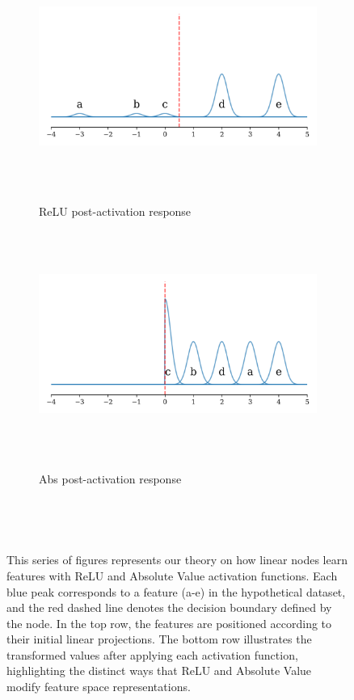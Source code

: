 \begin{figure}[ht]
    \begin{subfigure}[b]{0.49\textwidth}
        \centering
        \includegraphics[width=\textwidth]{images/activation_demo_relu_post}
        \caption{ReLU post-activation response}
        \label{fig:relu_post}
    \end{subfigure}
    \hfill
    \begin{subfigure}[b]{0.49\textwidth}
        \centering
        \includegraphics[width=\textwidth]{images/activation_demo_abs_post}
        \caption{Abs post-activation response}
        \label{fig:abs_post}
    \end{subfigure}

    \caption{This series of figures represents our theory on how linear nodes learn features with ReLU and Absolute Value activation functions. Each blue peak corresponds to a feature (a-e) in the hypothetical dataset, and the red dashed line denotes the decision boundary defined by the node. In the top row, the features are positioned according to their initial linear projections. The bottom row illustrates the transformed values after applying each activation function, highlighting the distinct ways that ReLU and Absolute Value modify feature space representations.}
    \label{fig:activation_demo}
\end{figure}

